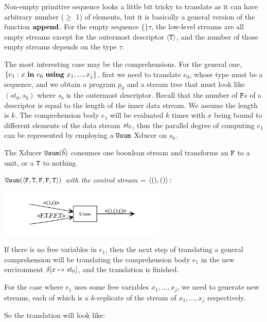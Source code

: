 Non-empty primitive sequence looks a little bit tricky to translate as it can have arbitrary  number ($\ge$ 1) of elements, but it is basically a general version of the function $\mathbf{append}$.
For the empty sequence $\{\}\tau$, the low-level streams are all empty streams except for the outermost descriptor $\langle \mathtt{T} \rangle$, and the number of those empty streams depends on the type $\tau$.

The most interesting case may be the comprehensions. 
For the general one, $\{e_1 : x \ \mathbf{in} \ e_0 \ \mathbf{using} \ x_1,...,x_j\}$, first we need to translate $e_0$, whose type must be a sequence, and we obtain a program $p_0$ and a stream tree that must look like $(st_0,s_b)$ where $s_b$ is the outermost descriptor. 
Recall that the number of $\mathtt{F}$s of a descriptor is equal to the length of the inner data stream. 
We assume the length is $k$. 
The comprehension body $e_1$ will be evaluated $k$ times with $x$ being bound to different elements of the data stream $\mathit{st}_0$, 
thus the parallel degree of computing $e_1$ can be represented by employing a $\mathtt{Usum}$ Xducer on $s_b$.

The Xducer $\mathtt{Usum}(\vec b)$ consumes one boonlean stream and transforms an $\mathtt{F}$ to a unit, or a $\mathtt{T}$ to nothing.
\begin{example} \emph{$\usumf{\<\F,\T,\F,\F,\T\'>}$ with the control stream = $\<(),() \'>$:} \\
	\begin{center}
		\includegraphics[width=0.6\textwidth]{fig/usum.png}
	\end{center}
\end{example}

If there is no free variables in $e_1$, then the next step of translating a general comprehension will be translating the comprehension body $e_1$ in the new environment $\del[x \|->\st_0]$, and the translation is finished.

For the case where $e_1$ uses some free variables $x_1,...,x_j$, we need to generate new streams, each of which is a $k$-replicate of the stream of $x_1,...,x_j$ respectively. 

So the translation will look like:\\[3ex]

